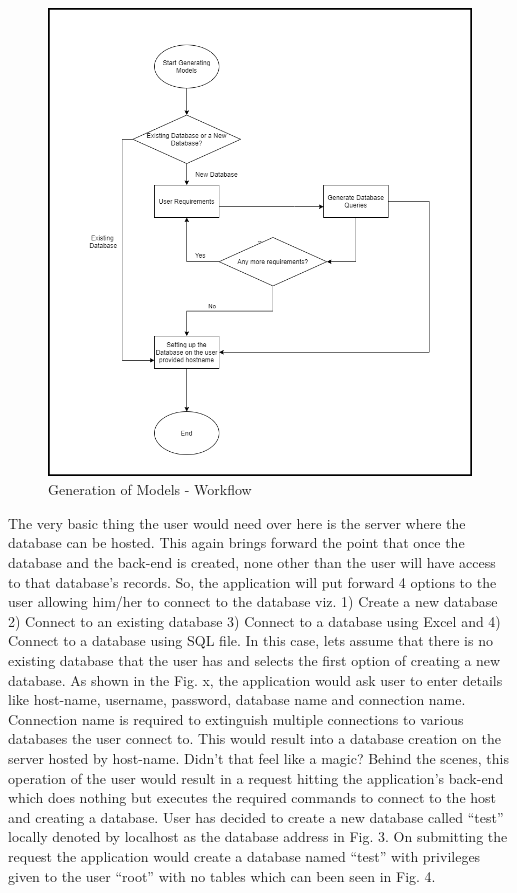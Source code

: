 \documentclass[letterpaper, 10 pt, conference]{ieeeconf}
\begin{document}
\begin{figure}[h]
   \centering
   \includegraphics[scale=0.25]{./Models2.png}
   \caption{Generation of Models - Workflow}
   \label{fig:my_label}
\end{figure}

The very basic thing the user would need over here is the server where the database can be hosted. This again brings forward the point that once the database and the back-end is created, none other than the user will have access to that database’s records. So, the application will put forward 4 options to the user allowing him/her to connect to the database viz. 1) Create a new database 2) Connect to an existing database 3) Connect to a database using Excel and 4) Connect to a database using SQL file. In this case, lets assume that there is no existing database that the user has and selects the first option of creating a new database. As shown in the Fig. x, the application would ask user to enter details like host-name, username, password, database name and connection name. Connection name is required to extinguish multiple connections to various databases the user connect to. This would result into a database creation on the server hosted by host-name. Didn't that feel like a magic? Behind the scenes, this operation of the user would result in a request hitting the application’s back-end which does nothing but executes the required commands to connect to the host and creating a database. User has decided to create a new database called “test” locally denoted by localhost as the database address in Fig. 3. On submitting the request the application would create a database named “test” with privileges given to the user “root” with no tables which can been seen in Fig. 4.
\end{document}
